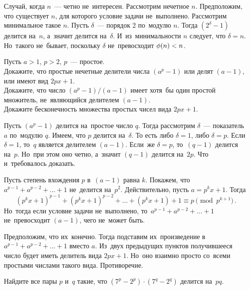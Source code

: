 \ifincludesolutions
Случай, когда $n$~--- четно не~интересен.
Рассмотрим нечетное $n$.
Предположим, что существует $n$, для которого условие задачи не~выполнено.
Рассмотрим минимальное такое $n$.
Пусть $\delta$~--- порядок 2 по~модулю $n$.
Тогда $(2^{\delta} - 1)$ делится на~$n$, а~значит делится на~$\delta$.
И~из~минимальности $n$ следует, что $\delta = n$.
Но~такого не~бывает, поскольку $\delta$ не~превосходит $\mathrm{\phi}(n) < n$.
\fi %

\begin{problems}

\item
Пусть $a > 1$, $p > 2$, $p$~--- простое.
\\
\subproblem
Докажите, что простые нечетные делители числа $(a^p - 1)$ или делят $(a - 1)$,
или имеют вид $2 p x + 1$.
\\
\subproblem
Докажите, что число $(a^p - 1) / (a - 1)$ имеет хотя~бы один простой
множитель, не~являющийся делителем $(a - 1)$.
\\
\subproblem
Докажите бесконечность множества простых чисел вида $2 p x + 1$.

\end{problems}

\ifincludesolutions
\resetsubproblem
\subproblem
Пусть $(a^p - 1)$ делится на~простое число $q$.
Тогда рассмотрим $\delta$~--- показатель $a$ по~модулю $q$.
Имеем, что $p$ делится на~$\delta$.
То есть либо $\delta = 1$, либо $\delta = p$.
Если $\delta = 1$, то~$q$ является делителем $(a - 1)$.
Если~же $\delta = p$, то~$(q - 1)$ делится на~$p$.
Но~при этом оно четно, а~значит $(q - 1)$ делится на~$2 p$.
Что и~требовалось доказать.
\par
\subproblem
Пусть степень вхождения $p$ в~$(a - 1)$ равна $k$.
Покажем, что $a^{p-1} + a^{p-2} + \ldots + 1$ не~делится на~$p^2$.
Действительно, пусть $a = p^k x + 1$.
Тогда
\[
    (p^k x + 1)^{p-1} + (p^k x + 1)^{p-2} + \ldots + (p^k x + 1) + 1
\equiv
    p
\pmod{p^{k+1}}
\, . \]
Но~тогда если условие задачи не~выполнено, то~$a^{p-1} + a^{p-2} + \ldots + 1$
не~превосходит $(a - 1)$, чего не~может быть.
\par
\subproblem
Предположим, что их~конечно.
Тогда подставим их~произведение в~$a^{p-1} + a^{p-2} + \ldots + 1$ вместо $a$.
Из~двух предыдущих пунктов получившееся число будет иметь делитель
вида $2 p x + 1$.
Но~оно взаимно просто со~всеми простыми числами такого вида.
Противоречие.
\fi %

\begin{problems}


\item
Найдите все пары $p$ и~$q$ такие, что $(7^{p} - 2^{p}) \cdot (7^{q} - 2^{q})$
делится на~$p q$.

\end{problems}

